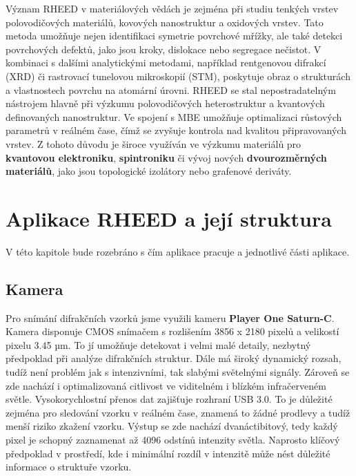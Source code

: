 \documentclass[a4paper,11pt]{article}
\begin{document}
Význam RHEED v materiálových vědách je zejména při studiu tenkých vrstev polovodičových materiálů, kovových nanostruktur a oxidových vrstev. Tato metoda umožňuje nejen identifikaci symetrie povrchové mřížky, ale také detekci povrchových defektů, jako jsou kroky, dislokace nebo segregace nečistot. V kombinaci s dalšími analytickými metodami, například rentgenovou difrakcí (XRD) či rastrovací tunelovou mikroskopií (STM), poskytuje obraz o strukturách a vlastnostech povrchu na atomární úrovni. RHEED se stal nepostradatelným nástrojem hlavně při výzkumu polovodičových heterostruktur a kvantových definovaných nanostruktur. Ve spojení s MBE umožňuje optimalizaci růstových parametrů v reálném čase, čímž se zvyšuje kontrola nad kvalitou připravovaných vrstev. Z tohoto důvodu je široce využíván ve výzkumu materiálů pro \textbf{kvantovou elektroniku}, \textbf{spintroniku} či vývoj nových \textbf{dvourozměrných materiálů}, jako jsou topologické izolátory nebo grafenové deriváty.\\
\newpage


\section{Aplikace RHEED a její struktura}
    V této kapitole bude rozebráno s čím aplikace pracuje a jednotlivé části aplikace.
\subsection{Kamera}
Pro snímání difrakčních vzorků jsme využili kameru \textbf{Player One Saturn-C}. Kamera disponuje CMOS snímačem s rozlišením 3856 x 2180 pixelů a velikostí pixelu 3.45 µm. To jí umožňuje detekovat i velmi malé detaily, nezbytný předpoklad při analýze difrakčních struktur.
    Dále má široký dynamický rozsah, tudíž není problém jak s intenzivními, tak slabými světelnými signály. Zároveň se zde nachází i optimalizovaná citlivost ve viditelném i blízkém infračerveném světle.
    Vysokorychlostní přenos dat zajišťuje rozhraní USB 3.0. To je důležité zejména pro sledování vzorku v reálném čase, znamená to žádné prodlevy a tudíž menší riziko zkažení vzorku.
    Výstup se zde nachází dvanáctibitový, tedy každý pixel je schopný zaznamenat až 4096 odstínů intenzity světla. Naprosto klíčový předpoklad v prostředí, kde i minimální rozdíl v intenzitě může nést důležité informace o struktuře vzorku.
    
\end{document}
